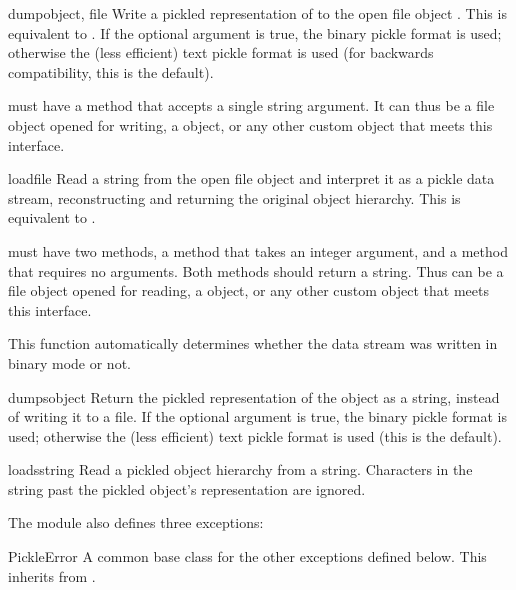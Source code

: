 \begin{funcdesc}{dump}{object, file}
Write a pickled representation of  to the open file object
.  This is equivalent to
.
If the optional  argument is true, the binary pickle format
is used; otherwise the (less efficient) text pickle format is used
(for backwards compatibility, this is the default).

 must have a  method that accepts a single
string argument.  It can thus be a file object opened for writing, a
 object, or any other custom
object that meets this interface.
\end{funcdesc}

\begin{funcdesc}{load}{file}
Read a string from the open file object  and interpret it as
a pickle data stream, reconstructing and returning the original object
hierarchy.  This is equivalent to .

 must have two methods, a  method that takes
an integer argument, and a  method that requires no
arguments.  Both methods should return a string.  Thus  can
be a file object opened for reading, a
 object, or any other custom
object that meets this interface.

This function automatically determines whether the data stream was
written in binary mode or not.
\end{funcdesc}

\begin{funcdesc}{dumps}{object}
Return the pickled representation of the object as a string, instead
of writing it to a file.  If the optional  argument is
true, the binary pickle format is used; otherwise the (less efficient)
text pickle format is used (this is the default).
\end{funcdesc}

\begin{funcdesc}{loads}{string}
Read a pickled object hierarchy from a string.  Characters in the
string past the pickled object's representation are ignored.
\end{funcdesc}

The  module also defines three exceptions:

\begin{excdesc}{PickleError}
A common base class for the other exceptions defined below.  This
inherits from .
\end{excdesc}

